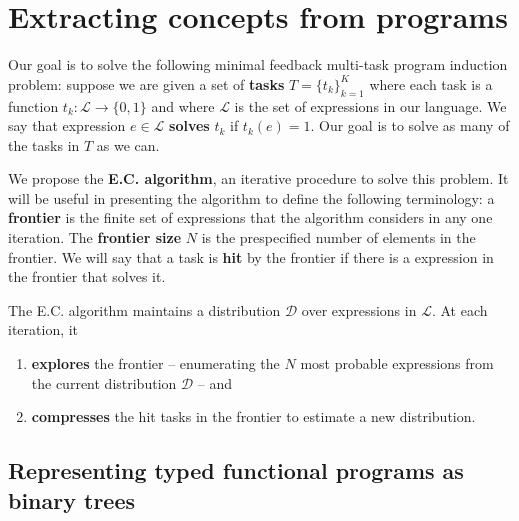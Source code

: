 \documentclass{article}
\begin{document}


\section{Extracting concepts from programs}

Our goal is to solve the following minimal feedback multi-task program
induction problem: suppose we are given a set of \textbf{tasks}
$T=\{t_k\}_{k=1}^K$ where each task is a function $t_k : \mathcal{L}
\rightarrow \{0, 1\}$ and where $\mathcal{L}$ is the set of
expressions in our language.  We say that expression $ e \in
\mathcal{L}$ \textbf{solves} $t_k$ if $ t_k(e) = 1$. Our goal is to
solve as many of the tasks in $T$ as we can. 

We propose the \textbf{E.C. algorithm}, an iterative procedure to solve this
problem. It will be useful in presenting the algorithm to define the
following terminology: a \textbf{frontier} is the finite set of
expressions that the algorithm considers in any one iteration. The
\textbf{frontier size} $N$ is the prespecified number of elements in
the frontier. We will say that a task is \textbf{hit} by the frontier
if there is a expression in the frontier that solves it.

The E.C. algorithm maintains a distribution $\mathcal{D}$ over
expressions in $\mathcal{L}$. At each iteration, it
\begin{enumerate}
\item \textbf{explores} the frontier -- enumerating the $N$ most probable expressions
  from the current distribution $\mathcal{D}$ -- and
\item \textbf{compresses} the hit tasks in the frontier to estimate a new
  distribution.
\end{enumerate}

\subsection{Representing typed functional programs as binary trees}
\end{document}
